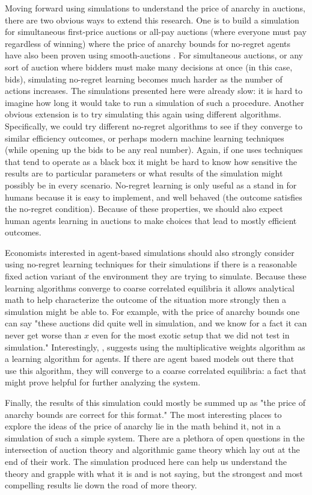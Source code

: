 \documentclass[12pt,twoside]{reedthesis}
\begin{document}
Moving forward using simulations to understand the price of anarchy in auctions, there are two obvious ways to extend this research. One is to build a simulation for simultaneous first-price auctions or all-pay auctions (where everyone must pay regardless of winning) where the price of anarchy bounds for no-regret agents have also been proven using smooth-auctions \citep{Roughgarden2017}. For simultaneous auctions, or any sort of auction where bidders must make many decisions at once (in this case, bids), simulating no-regret learning becomes much harder as the number of actions increases. The simulations presented here were already slow: it is hard to imagine how long it would take to run a simulation of such a procedure. Another obvious extension is to try simulating this again using different algorithms. Specifically, we could try different no-regret algorithms to see if they converge to similar efficiency outcomes, or perhaps modern machine learning techniques (while opening up the bids to be any real number). Again, if one uses techniques that tend to operate as a black box it might be hard to know how sensitive the results are to particular parameters or what results of the simulation might possibly be in every scenario. No-regret learning is only useful as a stand in for humans because it is easy to implement, and well behaved (the outcome satisfies the no-regret condition). Because of these properties, we should also expect human agents learning in auctions to make choices that lead to mostly efficient outcomes. 

Economists interested in agent-based simulations should also strongly consider using no-regret learning techniques for their simulations if there is a reasonable fixed action variant of the environment they are trying to simulate. Because these learning algorithms converge to coarse correlated equilibria it allows analytical math to help characterize the outcome of the situation more strongly then a simulation might be able to. For example, with the price of anarchy bounds one can say "these auctions did quite well in simulation, and we know for a fact it can never get worse than $x$ even for the most exotic setup that we did not test in simulation." Interestingly, \cite{Arthur1991}, suggests using the multiplicative weights algorithm as a learning algorithm for agents. If there are agent based models out there that use this algorithm, they will converge to a coarse correlated equilibria: a fact that might prove helpful for further analyzing the system.

Finally, the results of this simulation could mostly be summed up as "the price of anarchy bounds are correct for this format." The most interesting places to explore the ideas of the price of anarchy lie in the math behind it, not in a simulation of such a simple system. There are a plethora of open questions in the intersection of auction theory and algorithmic game theory which \cite{Roughgarden2017} lay out at the end of their work. The simulation produced here can help us understand the theory and grapple with what it is and is not saying, but the strongest and most compelling results lie down the road of more theory.
\end{document}
